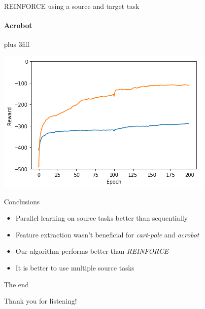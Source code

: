 \documentclass{beamer}
\begin{document}
\begin{frame}[fragile]{REINFORCE using a source and target task}
\framesubtitle{Acrobot}
\vskip0pt plus 3fill
\begin{center}
    \includegraphics[width=.8\linewidth]{results/Acrobot/reinforce_2tasks.png}
\end{center}
\end{frame}

\begin{frame}[fragile]{Conclusions}
\begin{itemize}
    \item Parallel learning on source tasks better than sequentially
    \item Feature extraction wasn't beneficial for \textit{cart-pole} and \textit{acrobot}
    \item Our algorithm performs better than \textit{REINFORCE}
    \item It is better to use multiple source tasks
\end{itemize}
\end{frame}

\begin{frame}[c]{The end}
\begin{center}
    \color{vubbleu} \LARGE\vubfont Thank you for listening!
\end{center}
\end{frame}
\end{document}
